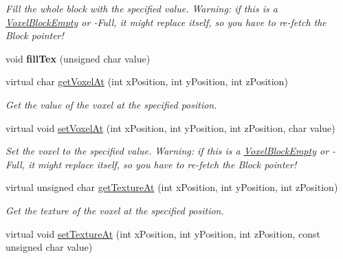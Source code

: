\begin{DoxyCompactItemize}
\begin{DoxyCompactList}\small\item\em \-Fill the whole block with the specified value. \-Warning\-: if this is a \hyperlink{classVoxelBlockEmpty}{\-Voxel\-Block\-Empty} or -\/\-Full, it might replace itself, so you have to re-\/fetch the \-Block pointer! \end{DoxyCompactList}\item 
\hypertarget{classVoxelBlockLoaded_ac6636b342ecb9087c838c0cb3a832c85}{
void {\bfseries fill\-Tex} (unsigned char value)}
\label{d0/df8/classVoxelBlockLoaded_ac6636b342ecb9087c838c0cb3a832c85}

\item 
\hypertarget{classVoxelBlockLoaded_a268fb7ff77d612e98f940d12524c72dd}{
virtual char \hyperlink{classVoxelBlockLoaded_a268fb7ff77d612e98f940d12524c72dd}{get\-Voxel\-At} (int x\-Position, int y\-Position, int z\-Position)}
\label{d0/df8/classVoxelBlockLoaded_a268fb7ff77d612e98f940d12524c72dd}

\begin{DoxyCompactList}\small\item\em \-Get the value of the voxel at the specified position. \end{DoxyCompactList}\item 
\hypertarget{classVoxelBlockLoaded_a0d9c149feb489387938b945c6c4171bd}{
virtual void \hyperlink{classVoxelBlockLoaded_a0d9c149feb489387938b945c6c4171bd}{set\-Voxel\-At} (int x\-Position, int y\-Position, int z\-Position, char value)}
\label{d0/df8/classVoxelBlockLoaded_a0d9c149feb489387938b945c6c4171bd}

\begin{DoxyCompactList}\small\item\em \-Set the voxel to the specified value. \-Warning\-: if this is a \hyperlink{classVoxelBlockEmpty}{\-Voxel\-Block\-Empty} or -\/\-Full, it might replace itself, so you have to re-\/fetch the \-Block pointer! \end{DoxyCompactList}\item 
\hypertarget{classVoxelBlockLoaded_ab831a4b64ff2c248b8d00af4ebae4ebc}{
virtual unsigned char \hyperlink{classVoxelBlockLoaded_ab831a4b64ff2c248b8d00af4ebae4ebc}{get\-Texture\-At} (int x\-Position, int y\-Position, int z\-Position)}
\label{d0/df8/classVoxelBlockLoaded_ab831a4b64ff2c248b8d00af4ebae4ebc}

\begin{DoxyCompactList}\small\item\em \-Get the texture of the voxel at the specified position. \end{DoxyCompactList}\item 
\hypertarget{classVoxelBlockLoaded_a14cb89b5ae8bfbe790d803f6b2a81932}{
virtual void \hyperlink{classVoxelBlockLoaded_a14cb89b5ae8bfbe790d803f6b2a81932}{set\-Texture\-At} (int x\-Position, int y\-Position, int z\-Position, const unsigned char value)}
\label{d0/df8/classVoxelBlockLoaded_a14cb89b5ae8bfbe790d803f6b2a81932}


\end{DoxyCompactItemize}

